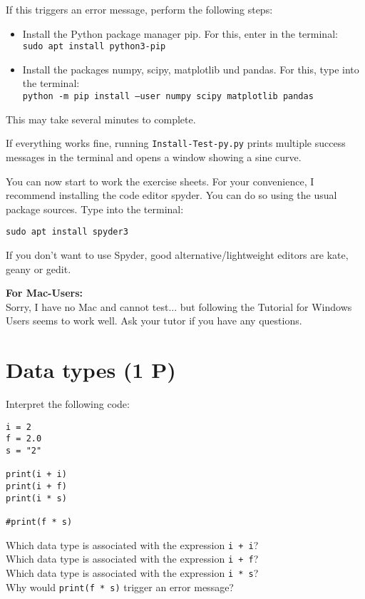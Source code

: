 \documentclass[
	english,
	fontsize=10pt,
	parskip=half,
	titlepage=true,
	DIV=12
]{scrartcl}
\newcommand*{\inPy}[1]{\texttt{#1}}
\begin{document}
If this triggers an error message, perform the following steps:
\begin{itemize}
\item Install the Python package manager pip. For this, enter in the terminal:\\
	\texttt{sudo apt install python3-pip}
\item Install the packages numpy, scipy, matplotlib und pandas. For this, type into the terminal:\\
	\texttt{python -m pip install --user numpy scipy matplotlib pandas}
\end{itemize}
This may take several minutes to complete.

If everything works fine, running \texttt{Install-Test-py.py} prints multiple success messages in the terminal and opens a window showing a sine curve.

You can now start to work the exercise sheets. For your convenience, I recommend installing the code editor spyder. You can do so using the usual package sources. Type into the terminal:
\begin{center}
\texttt{sudo apt install spyder3}
\end{center}

If you don't want to use Spyder, good alternative/lightweight editors are kate, geany or gedit.

\textbf{For Mac-Users:}\\
Sorry, I have no Mac and cannot test... but following the Tutorial for Windows Users seems to work well. Ask your tutor if you have any questions.


\section{Data types (1 P)}
Interpret the following code:
\begin{verbatim}
i = 2
f = 2.0
s = "2"

print(i + i)
print(i + f)
print(i * s)

#print(f * s)
\end{verbatim}

Which data type is associated with the expression \inPy{i + i}?\\
Which data type is associated with the expression \inPy{i + f}?\\
Which data type is associated with the expression \inPy{i * s}?\\
Why would \inPy{print(f * s)} trigger an error message?
\end{document}
